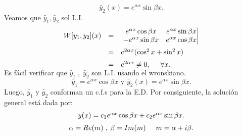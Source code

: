 \documentclass{beamer}
\begin{document}
\begin{frame}[t]
	\begin{block}{}
		\[
			\tilde{y_2} (x) = e^{\alpha x} \sin \beta x.
		\]
		Veamos que \(\tilde{y_1} , \tilde{y_2}\) sol L.I. \vspace{-6mm}
		\[
			\begin{array}{rcl}
				W[y_1,y_2] (x) & = & \begin{vmatrix}
					e^{\alpha x} \cos \beta x & e^{\alpha x} \sin \beta x \\
					-e^{\alpha x} \sin \beta x & e^{\alpha x} \cos \beta x
				\end{vmatrix}\\[4mm]
				& = & e^{2\alpha x} (\cos ^2x+ \sin ^2x) \\[2mm]
				& = & e^{2\alpha x} \ne 0, \hspace{5mm} \forall x. \vspace{-3mm}
			\end{array}
		\]
		Es fácil verificar que \(\tilde{y_1} \;,\; \tilde{y_2}\) son L.I. usando el wronskiano.
		\[
			\tilde{y_1} = e^{\alpha x} \cos \beta x \mbox{  y  } \tilde{y_2} (x) = e^{\alpha x} \sin \beta x.
		\]
		Luego, \(\tilde{y_1}\) y \(\tilde{y_2}\) conforman un c.f.s para la E.D. Por consiguiente, la solución general está dada por:
		\[
			\begin{array}{c}
				y(x) = c_1 e^{\alpha x} \cos \beta x+c_2e^{\alpha x} \sin \beta x. \\[2mm]
				\alpha = Re(m) \;,\; \beta =Im(m) \hspace{5mm} m = \alpha +i \beta .
			\end{array}
		\]
	\end{block}
\end{frame}
\end{document}
